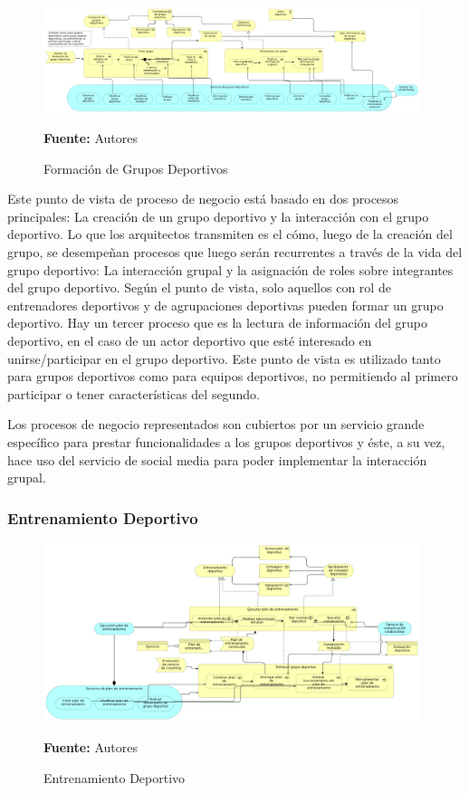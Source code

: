 \begin{figure}[!htb]
  \begin{center}
    \includegraphics[width=11cm]{./imagenes/business_process/formaciongruposdeportivos.png}
    \caption{Formación de Grupos Deportivos}
    \label{fig:bp_formacion_grupos_deportivos}
    \textbf{Fuente:}  Autores
  \end{center}
\end{figure}

Este punto de vista de proceso de negocio está basado en dos procesos principales: La creación de un grupo deportivo y la interacción con el grupo deportivo. Lo que los arquitectos transmiten es el cómo, luego de la creación del grupo, se desempeñan procesos que luego serán recurrentes a través de la vida del grupo deportivo: La interacción grupal y la asignación de roles sobre integrantes del grupo deportivo. Según el punto de vista, solo aquellos con rol de entrenadores deportivos y de agrupaciones deportivas pueden formar un grupo deportivo. Hay un tercer proceso que es la lectura de información del grupo deportivo, en el caso de un actor deportivo que esté interesado en unirse/participar en el grupo deportivo. Este punto de vista es utilizado tanto para grupos deportivos como para equipos deportivos, no permitiendo al primero participar o tener características del segundo.

Los procesos de negocio representados son cubiertos por un servicio grande específico para prestar funcionalidades a los grupos deportivos y éste, a su vez, hace uso del servicio de social media para poder implementar la interacción grupal.

\subsubsection{Entrenamiento Deportivo}

\begin{figure}[!htb]
  \begin{center}
    \includegraphics[width=11cm]{./imagenes/business_process/entrenamientodeportivo.png}
    \caption{Entrenamiento Deportivo}
    \label{fig:bp_entrenamiento_deportivo}
    \textbf{Fuente:}  Autores
  \end{center}
\end{figure}

